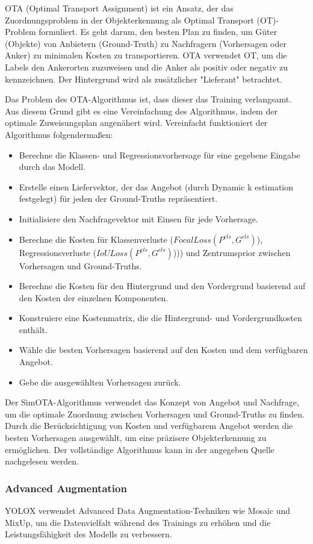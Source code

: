 OTA (Optimal Transport Assignment) ist ein Ansatz, der das Zuordnungsproblem in der Objekterkennung als Optimal Transport (OT)-Problem formuliert. Es geht darum, den besten Plan zu finden, um Güter (Objekte) von Anbietern (Ground-Truth) zu Nachfragern (Vorhersagen oder Anker) zu minimalen Kosten zu transportieren. OTA verwendet OT, um die Labels den Ankerorten zuzuweisen und die Anker als positiv oder negativ zu kennzeichnen. Der Hintergrund wird als zusätzlicher "Lieferant" betrachtet. 

Das Problem des OTA-Algorithmus ist, dass dieser das Training verlangsamt. Aus diesem Grund gibt es eine Vereinfachung des Algorithmus, indem der optimale Zuweisungsplan angenähert wird. Vereinfacht funktioniert der Algorithmus folgendermaßen:
\begin{itemize}
	\item Berechne die Klassen- und Regressionsvorhersage für eine gegebene Eingabe durch das Modell.
	\item Erstelle einen Liefervektor, der das Angebot (durch Dynamic k estimation festgelegt) für jeden der Ground-Truths repräsentiert.
	\item Initialisiere den Nachfragevektor mit Einsen für jede Vorhersage.
	\item Berechne die Kosten für Klassenverluste ($FocalLoss(P^{cls}, G^{cls})$), Regressionsverluste ($IoULoss(P^{cls}, G^{cls})$))) und Zentrumsprior zwischen Vorhersagen und Ground-Truths.
	\item Berechne die Kosten für den Hintergrund und den Vordergrund basierend auf den Kosten der einzelnen Komponenten.
	\item Konstruiere eine Kostenmatrix, die die Hintergrund- und Vordergrundkosten enthält.
	\item Wähle die besten Vorhersagen basierend auf den Kosten und dem verfügbaren Angebot.
	\item Gebe die ausgewählten Vorhersagen zurück.
\end{itemize}

Der SimOTA-Algorithmus verwendet das Konzept von Angebot und Nachfrage, um die optimale Zuordnung zwischen Vorhersagen und Ground-Truths zu finden. Durch die Berücksichtigung von Kosten und verfügbarem Angebot werden die besten Vorhersagen ausgewählt, um eine präzisere Objekterkennung zu ermöglichen. Der vollständige Algorithmus kann in der angegeben Quelle nachgelesen werden.  \cite{yoloxExplanationSimOTA}


\subsubsection{Advanced Augmentation}\label{chap:advancedAug}
YOLOX verwendet Advanced Data Augmentation-Techniken wie Mosaic und MixUp, um die Datenvielfalt während des Trainings zu erhöhen und die Leistungsfähigkeit des Modells zu verbessern.

